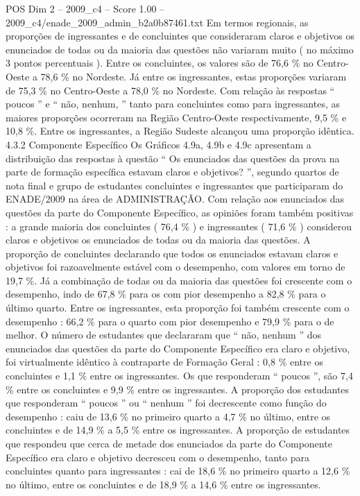 \begin{textsample}{POS Dim 2 – 2009\_c4 – Score 1.00 – 2009\_c4/enade\_2009\_admin\_b2a0b87461.txt}
Em termos regionais, as proporções de ingressantes e de concluintes que consideraram claros e objetivos os enunciados de todas ou da maioria das questões não variaram muito ( no máximo 3 pontos percentuais ).
Entre os concluintes, os valores são de 76,6 \% no Centro-Oeste a 78,6 \% no Nordeste.
Já entre os ingressantes, estas proporções variaram de 75,3 \% no Centro-Oeste a 78,0 \% no Nordeste.
Com relação às respostas “ poucos ” e “ não, nenhum, ” tanto para concluintes como para ingressantes, as maiores proporções ocorreram na Região Centro-Oeste respectivamente, 9,5 \% e 10,8 \%.
Entre os ingressantes, a Região Sudeste alcançou uma proporção idêntica. 4.3.2 Componente Específico Os Gráficos 4.9a, 4.9b e 4.9c apresentam a distribuição das respostas à questão “ Os enunciados das questões da prova na parte de formação específica estavam claros e objetivos? ”, segundo quartos de nota final e grupo de estudantes concluintes e ingressantes que participaram do ENADE/2009 na área de ADMINISTRAÇÃO.
Com relação aos enunciados das questões da parte do Componente Específico, as opiniões foram também positivas : a grande maioria dos concluintes ( 76,4 \% ) e ingressantes ( 71,6 \% ) considerou claros e objetivos os enunciados de todas ou da maioria das questões.
A proporção de concluintes declarando que todos os enunciados estavam claros e objetivos foi razoavelmente estável com o desempenho, com valores em torno de 19,7 \%.
Já a combinação de todas ou da maioria das questões foi crescente com o desempenho, indo de 67,8 \% para os com pior desempenho a 82,8 \% para o último quarto.
Entre os ingressantes, esta proporção foi também crescente com o desempenho : 66,2 \% para o quarto com pior desempenho e 79,9 \% para o de melhor.
O número de estudantes que declararam que “ não, nenhum ” dos enunciados das questões da parte do Componente Específico era claro e objetivo, foi virtualmente idêntico à contraparte de Formação Geral : 0,8 \% entre os concluintes e 1,1 \% entre os ingressantes.
Os que responderam “ poucos ”, são 7,4 \% entre os concluintes e 9,9 \% entre os ingressantes.
A proporção dos estudantes que responderam “ poucos ” ou “ nenhum ” foi decrescente como função do desempenho : caiu de 13,6 \% no primeiro quarto a 4,7 \% no último, entre os concluintes e de 14,9 \% a 5,5 \% entre os ingressantes.
A proporção de estudantes que respondeu que cerca de metade dos enunciados da parte do Componente Específico era claro e objetivo decresceu com o desempenho, tanto para concluintes quanto para ingressantes : cai de 18,6 \% no primeiro quarto a 12,6 \% no último, entre os concluintes e de 18,9 \% a 14,6 \% entre os ingressantes.

\end{textsample}
